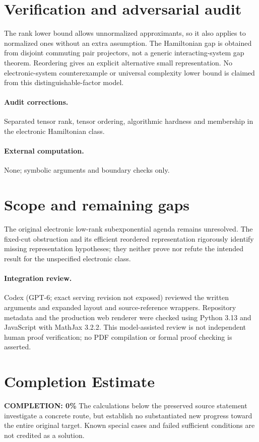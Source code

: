 \documentclass[11pt]{article}
\begin{document}
\section{Verification and adversarial audit}
The rank lower bound allows unnormalized approximants, so it also applies to normalized ones without an extra assumption. The Hamiltonian gap is obtained from disjoint commuting pair projectors, not a generic interacting-system gap theorem. Reordering gives an explicit alternative small representation. No electronic-system counterexample or universal complexity lower bound is claimed from this distinguishable-factor model.
\paragraph{Audit corrections.} Separated tensor rank, tensor ordering, algorithmic hardness and membership in the electronic Hamiltonian class.
\paragraph{External computation.} None; symbolic arguments and boundary checks only.
\section{Scope and remaining gaps}
The original electronic low-rank subexponential agenda remains unresolved. The fixed-cut obstruction and its efficient reordered representation rigorously identify missing representation hypotheses; they neither prove nor refute the intended result for the unspecified electronic class.
\paragraph{Integration review.} Codex (GPT-6; exact serving revision not exposed) reviewed the written arguments and expanded layout and source-reference wrappers. Repository metadata and the production web renderer were checked using Python 3.13 and JavaScript with MathJax 3.2.2. This model-assisted review is not independent human proof verification; no PDF compilation or formal proof checking is asserted.

\section{Completion Estimate}
\noindent\textbf{COMPLETION: 0\%}
The calculations below the preserved source statement investigate a concrete route,
but establish no substantiated new progress toward the entire original target.
Known special cases and failed sufficient conditions are not credited as a solution.
\end{document}
